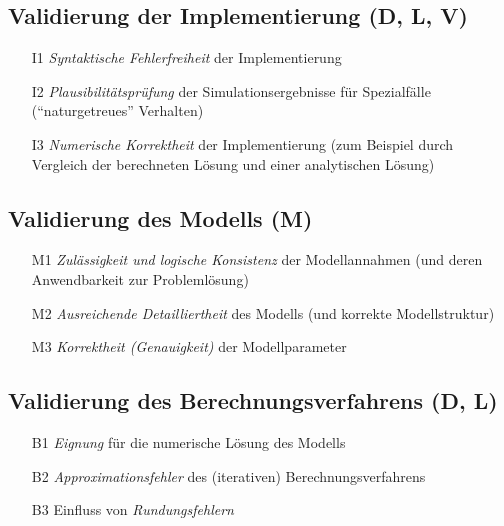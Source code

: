 \documentclass[a4paper, 11pt, accentcolor = tud3b]{tudreport}
\begin{document}
            \subsection{Validierung der Implementierung (D, L, V)} %
                \begin{itemize}
                	\item[I1] \textit{Syntaktische Fehlerfreiheit} der Implementierung
                	\item[I2] \textit{Plausibilitätsprüfung} der Simulationsergebnisse für Spezialfälle (\enquote{naturgetreues} Verhalten)
                	\item[I3] \textit{Numerische Korrektheit} der Implementierung (zum Beispiel durch Vergleich der berechneten Lösung und einer analytischen Lösung)
                \end{itemize}

            \subsection{Validierung des Modells (M)} %
                \begin{itemize}
                	\item[M1] \textit{Zulässigkeit und logische Konsistenz} der Modellannahmen (und deren Anwendbarkeit zur Problemlösung)
                	\item[M2] \textit{Ausreichende Detailliertheit} des Modells (und korrekte Modellstruktur)
                	\item[M3] \textit{Korrektheit (Genauigkeit)} der Modellparameter
                \end{itemize}

            \subsection{Validierung des Berechnungsverfahrens (D, L)} %
                \begin{itemize}
                	\item[B1] \textit{Eignung} für die numerische Lösung des Modells
                	\item[B2] \textit{Approximationsfehler} des (iterativen) Berechnungsverfahrens
                	\item[B3] Einfluss von \textit{Rundungsfehlern}
                \end{itemize}
\end{document}
